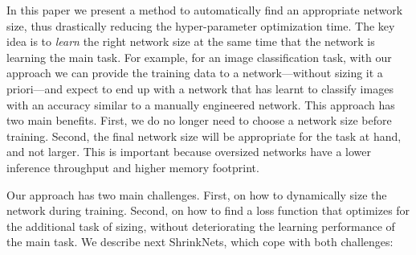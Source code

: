 \documentclass[sigconf]{acmart}
\newcommand{\gl}[1]{\textcolor{violet}{{\bf Gl:} #1}}
\begin{document}

In this paper we present a method to automatically find an appropriate network
size, thus
drastically reducing the hyper-parameter optimization time.
The key idea is to
\emph{learn} the right network size at the same time that the network is
learning the main task. For example, for an image classification task, with our
approach we can provide the training data to a network---without sizing it a
priori---and expect to end up with a network that has learnt to classify images
with an accuracy similar to a manually engineered network.
This approach has two main benefits. First, we do no longer need to choose a
network size before training. Second, the final network size will be
appropriate for the task at hand, and not larger. 
This is important
because oversized networks have a lower inference throughput and higher memory
footprint.

Our approach has two main challenges. First, on how to dynamically size the
network during training. Second, on how to find a loss function that optimizes
for the additional task of sizing, without deteriorating the learning
performance of the main task. We describe next ShrinkNets, which cope with both
challenges:

% 
% 
\end{document}
